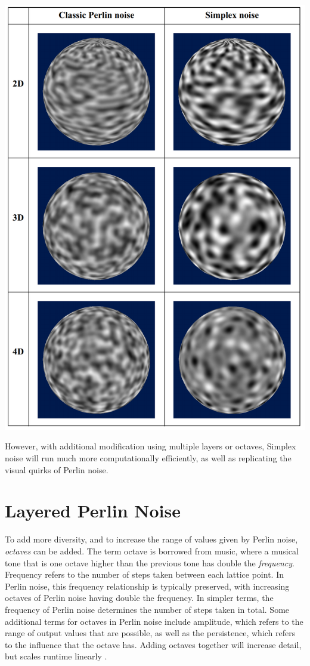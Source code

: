 \documentclass[10pt]{report}
\begin{document}
			\begin{minipage}{\textwidth}
				\centering
				\includegraphics[scale=.2]{perlin vs simplex}
				\label{fig:fig4}
			\end{minipage}
			
			However, with additional modification using multiple layers or octaves, Simplex noise will run much more computationally efficiently, as well as replicating the visual quirks of Perlin noise.
			
			\section{Layered Perlin Noise}
			To add more diversity, and to increase the range of values given by Perlin noise, \emph{octaves} can be added. The term octave is borrowed from music, where a musical tone that is one octave higher than the previous tone has double the \emph{frequency}. Frequency refers to the number of steps taken between each lattice point. In Perlin noise, this frequency relationship is typically preserved, with increasing octaves of Perlin noise having double the frequency. In simpler terms, the frequency of Perlin noise determines the number of steps taken in total. Some additional terms for octaves in Perlin noise include amplitude, which refers to the range of output values that are possible, as well as the persistence, which refers to the influence that the octave has. Adding octaves together will increase detail, but scales runtime linearly \cite{pn-under}.
			
\end{document}

